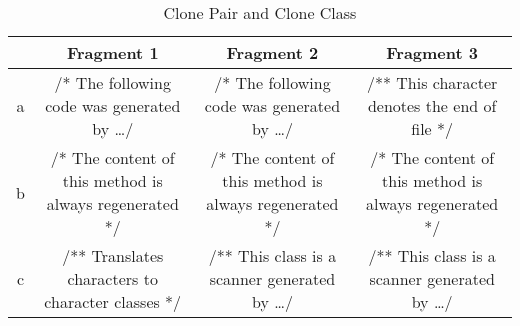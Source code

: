 \setlength{\extrarowheight}{.5em}
\begin{table}
	\caption{Clone Pair and Clone Class}
	\label{table:cloneClass}
	\begin{tabularx}{1.0\textwidth}{|c|C|C|C|}
		\hline
		&Fragment 1 & Fragment 2 & Fragment 3 \\
		\hline
		a &
		/* The following code was generated by \dots */ &
		/* The following code was generated by \dots */ &
		/** This character denotes the end of file */ \\
		\hline
		b &
		/* The content of this method is always regenerated */ &
		/* The content of this method is always regenerated */ &
		/* The content of this method is always regenerated */ \\
		\hline
		c &
		/** Translates characters to character classes
		*/ &
		 /** This class is a scanner generated by \dots */ &
		 /** This class is a scanner generated by \dots */ \\
		\hline
	\end{tabularx}
\end{table}
\setlength{\extrarowheight}{0em}
